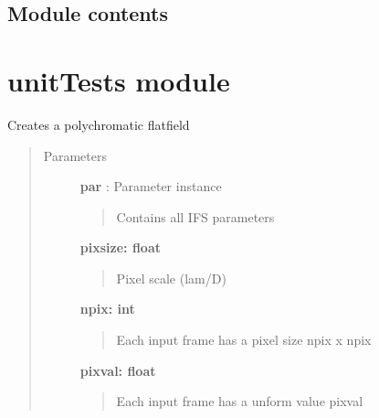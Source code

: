 \documentclass[letterpaper,10pt,english]{sphinxmanual}
\begin{document}

\begin{fulllineitems}
\label{tools:tools.wavecal.make_polychrome}
\end{fulllineitems}



\section{Module contents}
\label{tools:module-tools}\label{tools:module-contents}

\chapter{unitTests module}
\label{unitTests:module-unitTests}\label{unitTests:unittests-module}\label{unitTests::doc}\label{unitTests:astropy}

\begin{fulllineitems}
\label{unitTests:unitTests.testCreateFlatfield}
Creates a polychromatic flatfield
\begin{quote}\begin{description}
\item[{Parameters}] \leavevmode
\textbf{par} :   Parameter instance
\begin{quote}

Contains all IFS parameters
\end{quote}

\textbf{pixsize:   float}
\begin{quote}

Pixel scale (lam/D)
\end{quote}

\textbf{npix: int}
\begin{quote}

Each input frame has a pixel size npix x npix
\end{quote}

\textbf{pixval: float}
\begin{quote}

Each input frame has a unform value pixval
\end{quote}

\end{description}\end{quote}

\end{fulllineitems}
\end{document}

